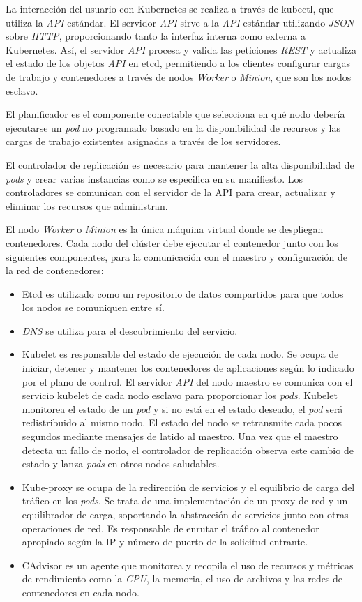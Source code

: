 La interacción del usuario con Kubernetes se realiza a través de kubectl, que utiliza la \textit{API} estándar. El servidor \textit{API} sirve a la \textit{API} estándar utilizando \textit{JSON} sobre \textit{HTTP}, proporcionando tanto la interfaz interna como externa a Kubernetes. Así, el servidor \textit{API} procesa y valida las peticiones \textit{REST} y actualiza el estado de los objetos \textit{API} en etcd, permitiendo a los clientes configurar cargas de trabajo y contenedores a través de nodos \textit{Worker} o \textit{Minion}, que son los nodos esclavo. 

El planificador es el componente conectable que selecciona en qué nodo debería ejecutarse un \textit{pod} no programado basado en la disponibilidad de recursos y las cargas de trabajo existentes asignadas a través de los servidores.


El controlador de replicación es necesario para mantener la alta disponibilidad de \textit{pods} y crear varias instancias como se especifica en su manifiesto. Los controladores se comunican con el servidor de la API para crear, actualizar y eliminar los recursos que administran. 

El nodo \textit{Worker} o \textit{Minion} es la única máquina virtual donde se despliegan contenedores. Cada nodo del clúster debe ejecutar el contenedor junto con los siguientes componentes, para la comunicación con el maestro y configuración de la red de contenedores:
\begin{itemize}
\item Etcd es utilizado como un repositorio de datos compartidos para que todos los nodos se comuniquen entre sí.
\item \textit{DNS} se utiliza para el descubrimiento del servicio.
\item Kubelet es responsable del estado de ejecución de cada nodo. Se ocupa de iniciar, detener y mantener los contenedores de aplicaciones según lo indicado por el plano de control. El servidor \textit{API} del nodo maestro se comunica con el servicio kubelet de cada nodo esclavo para proporcionar los \textit{pods}. Kubelet monitorea el estado de un \textit{pod} y si no está en el estado deseado, el \textit{pod} será redistribuido al mismo nodo. El estado del nodo se retransmite cada pocos segundos mediante mensajes de latido al maestro. Una vez que el maestro detecta un fallo de nodo, el controlador de replicación observa este cambio de estado y lanza \textit{pods} en otros nodos saludables.
\item Kube-proxy se ocupa de la redirección de servicios y el equilibrio de carga del tráfico en los \textit{pods}. Se trata de una implementación de un proxy de red y un equilibrador de carga, soportando la abstracción de servicios junto con otras operaciones de red. Es responsable de enrutar el tráfico al contenedor apropiado según la IP y número de puerto de la solicitud entrante.
\item CAdvisor es un agente que monitorea y recopila el uso de recursos y métricas de rendimiento como la \textit{CPU}, la memoria, el uso de archivos y las redes de contenedores en cada nodo.
\end{itemize}

